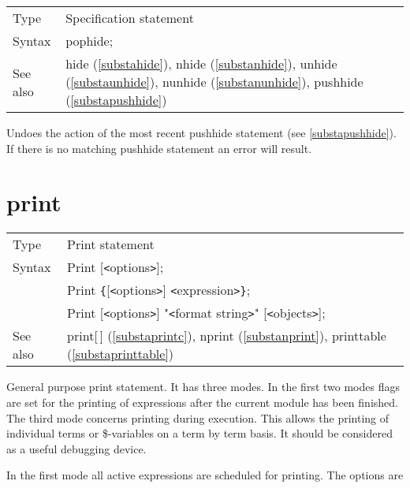 \noindent \begin{tabular}{ll}
Type & Specification statement\\
Syntax & pophide;
\\ See also & hide (\ref{substahide}),
              nhide (\ref{substanhide}),
              unhide (\ref{substaunhide}),
              nunhide (\ref{substanunhide}),
              pushhide (\ref{substapushhide})
\end{tabular} \vspace{4mm}

\noindent Undoes the action of the most recent 
pushhide statement (see \ref{substapushhide}). If there is 
no matching pushhide statement an error will result. \vspace{10mm}

 
\section{print}
\label{substaprint}

\noindent \begin{tabular}{ll}
Type & Print statement\\
Syntax & Print [{\tt<}options{\tt>}]; \\
       & Print \verb:{:[{\tt<}options{\tt>}] {\tt<}expression{\tt>}\verb:}:; \\
       & Print [{\tt<}options{\tt>}] "{\tt<}format string{\tt>}" [{\tt<}objects{\tt>}];
\\ See also & print[\,] (\ref{substaprintc}),
              nprint (\ref{substanprint}),
              printtable (\ref{substaprinttable})
\end{tabular}\vspace{4mm}

\noindent General purpose print statement. It has three modes. In 
the first two modes flags are set for the printing of expressions after the 
current module has been finished. The third mode concerns printing during 
execution. This allows the printing of individual terms or 
\$-variables on a term by term basis. It should be 
considered as a useful debugging device.

\noindent In the first mode all active expressions are 
scheduled for printing. The options are


